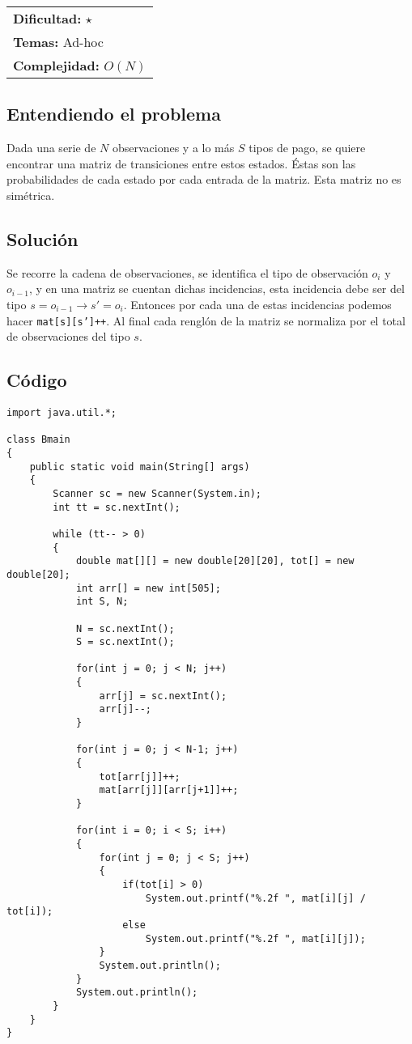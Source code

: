 \hfill
\begin{tabular}{@{}l@{}}
\textbf{Dificultad:} $\star$ \\
\textbf{Temas:} Ad-hoc \\
\textbf{Complejidad:} $O(N)$
\end{tabular}

\subsection*{Entendiendo el problema}
Dada una serie de $N$ observaciones y a lo más $S$ tipos de pago, se quiere encontrar una matriz de transiciones entre estos estados. Éstas son las probabilidades de cada estado por cada entrada de la matriz. Esta matriz no es simétrica.

\subsection*{Solución}
Se recorre la cadena de observaciones, se identifica el tipo de observación $o_i$ y $o_{i-1}$, y en una matriz se cuentan dichas incidencias, esta incidencia debe ser del tipo $s= o_{i-1} \rightarrow s' = o_{i}$. Entonces por cada una de estas incidencias podemos hacer \texttt{mat[s][s']++}. Al final cada renglón de la matriz se normaliza por el total de observaciones del tipo $s$.


\subsection*{Código}
\begin{verbatim}
import java.util.*;

class Bmain
{
	public static void main(String[] args)
	{
		Scanner sc = new Scanner(System.in);
		int tt = sc.nextInt();
		 
		while (tt-- > 0)
		{
			double mat[][] = new double[20][20], tot[] = new double[20];
			int arr[] = new int[505];
			int S, N;

			N = sc.nextInt();
			S = sc.nextInt();

			for(int j = 0; j < N; j++)
			{
				arr[j] = sc.nextInt();
				arr[j]--;
			}

			for(int j = 0; j < N-1; j++)
			{
				tot[arr[j]]++;
				mat[arr[j]][arr[j+1]]++;
			}

			for(int i = 0; i < S; i++)
			{
				for(int j = 0; j < S; j++)
				{
					if(tot[i] > 0)
						System.out.printf("%.2f ", mat[i][j] / tot[i]);
					else
						System.out.printf("%.2f ", mat[i][j]);
				}
				System.out.println();
			}
			System.out.println();
		}
	}
}
\end{verbatim}

